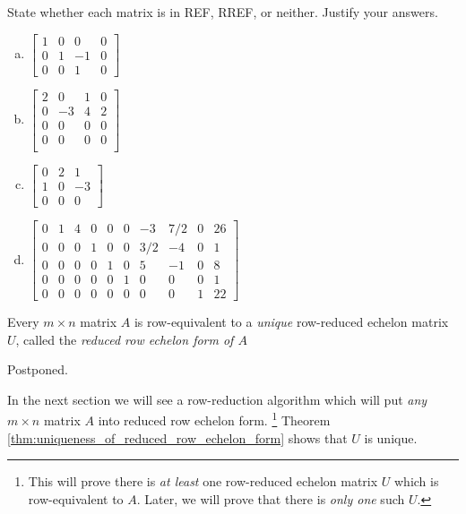 \documentclass[12pt,letterpaper,reqno]{article}
\numberwithin{equation}{section}
\newcommand{\ti}[1]{\textit{#1}}
\newcommand{\fixme}[1]{{\color{orange}{[#1]}}}
\begin{document}
\begin{exercise}
	State whether each matrix is in REF, RREF, or neither. Justify your answers.
	\begin{enumerate}[(a)]
	\item $\begin{bmatrix}
		1&0&0&0 \\
		0&1&-1&0 \\
		0&0&1&0
	\end{bmatrix}$
	\item $\begin{bmatrix}
		2 &0&1&0 \\
		0&-3&4&2 \\
		0&0&0&0 \\
		0&0&0&0 \\
	\end{bmatrix}$
	\item $\begin{bmatrix}
		0&2&1 \\
		1&0&-3 \\
		0&0&0 
	\end{bmatrix}$
	\item $\begin{bmatrix}
		0&1&4&0&0&0&-3&7/2 & 0 & 26 \\
		0&0&0&1&0&0&3/2&-4 & 0 & 1 \\
		0&0&0&0&1&0&5&-1&0&8 \\
		0&0&0&0&0&1&0&0&0&1 \\
		0&0&0&0&0&0&0&0 & 1 & 22
	\end{bmatrix}$
\end{enumerate}
\end{exercise}

\begin{thm}\label{thm:uniqueness_of_reduced_row_echelon_form}
	Every $m \times n$ matrix $A$ is row-equivalent to a \emph{unique} row-reduced echelon matrix $U$, called the \ti{reduced row echelon form of $A$}
\end{thm}

\begin{pf}
Postponed. \fixme{Insert link to proof.}
\end{pf}

In the next section we will see a row-reduction algorithm which will put \ti{any} $m \times n$ matrix $A$ into reduced row echelon form. \footnote{This will prove there is \emph{at least} one row-reduced echelon matrix $U$ which is row-equivalent to $A$. Later, we will prove that there is \emph{only one} such $U$.} Theorem \ref{thm:uniqueness_of_reduced_row_echelon_form} shows that $U$ is unique. \fixme{Explain here why RREF is what we want to arrive at by performing elementary row operations. Columns with no leading 1s are called free variables. These will be parameters, and the leading 1s allow us to solve for the remaining variables in terms of the free ones, giving us the parametric description of the solution set.}
\end{document}
